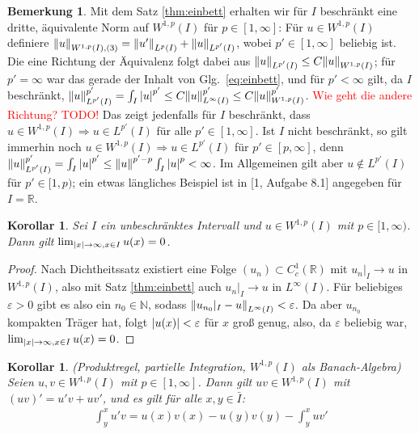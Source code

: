 \documentclass[twoside]{article}
\newtheorem{corollary}[theorem]{Korollar}
\theoremstyle{definition}
\newtheorem{remark}[theorem]{Bemerkung}
\begin{document}
\begin{remark}
Mit dem Satz \ref{thm:einbett} erhalten wir für $I$ beschränkt eine dritte, äquivalente Norm auf $W^{1,p}(I)$ für $p \in [1,\infty]$: Für $u \in W^{1,p}(I)$ definiere $\norm{u}_{W^{1,p}(I),(3)} = \norm{u'}_{L^p(I)} + \norm{u}_{L^{p'}(I)}$, wobei $p' \in [1,\infty]$ beliebig ist. Die eine Richtung der Äquivalenz folgt dabei aus $\norm{u}_{L^{p'}(I)} \leq C \norm{u}_{W^{1,p}(I)}$; für $p' = \infty$ war das gerade der Inhalt von Glg.\ \ref{eq:einbett}, und für $p' < \infty$ gilt, da $I$ beschränkt, $\norm{u}_{L^{p'}(I)}^{p'} = \int_I \abs{u}^{p'} \leq C \norm{u}_{L^\infty(I)}^{p'} \leq C \norm{u}_{W^{1,p}(I)}^{p'}$. \textcolor{red}{Wie geht die andere Richtung? TODO!} Das zeigt jedenfalls für $I$ beschränkt, dass $u \in W^{1,p}(I) \Rightarrow u \in L^{p'}(I)$ für alle $p' \in [1,\infty]$. Ist $I$  nicht beschränkt, so gilt immerhin noch $u \in W^{1,p}(I) \Rightarrow u \in L^{p'}(I)$ für $p' \in [p,\infty]$, denn $\norm{u}_{L^{p'}(I)}^{p'} = \int_I \abs{u}^{p'} \leq \norm{u}^{p'-p} \int_I \abs{u}^p < \infty$. Im Allgemeinen gilt aber $u \not \in L^{p'}(I)$ für $p' \in [1,p)$; ein etwas längliches Beispiel ist in [1, Aufgabe 8.1] angegeben für $I = \mathbb{R}$.
\end{remark}
\begin{corollary} \label{kor:gw}
Sei $I$ ein unbeschränktes Intervall und $u \in W^{1,p}(I)$ mit $p \in [1,\infty)$. Dann gilt $\lim_{\abs{x} \to \infty, x \in I} u(x) = 0$.
\end{corollary}
\begin{proof}
Nach Dichtheitssatz existiert  eine Folge $(u_n) \subset C_c^1(\mathbb{R})$ mit $u_n|_I \to u$ in $W^{1,p}(I)$, also mit Satz \ref{thm:einbett} auch $u_n|_I \to u$ in $L^{\infty}(I)$. Für beliebiges $\varepsilon > 0$ gibt es also ein $n_0 \in \mathbb{N}$, sodass $\norm{u_{n_0}|_I - u}_{L^{\infty}(I)} < \varepsilon$. Da aber $u_{n_0}$ kompakten Träger hat, folgt $\abs{u(x)} < \varepsilon$ für $x$ groß genug, also, da $\varepsilon$ beliebig war,  $\lim_{\abs{x} \to \infty, x \in I} u(x) = 0$.
\end{proof}
\begin{corollary}(Produktregel, partielle Integration, $W^{1,p}(I)$ als Banach-Algebra) \label{kor:partint}\\
Seien $u,v \in W^{1,p}(I)$ mit $p \in [1,\infty]$. Dann gilt $uv \in W^{1,p}(I)$ mit $(uv)'=u'v+uv'$, und es gilt für alle $x,y \in \bar{I}$:
\begin{align}
\int_y^x u'v = u(x)v(x)-u(y)v(y)-\int_y^xuv'
\end{align}
\end{corollary}
\end{document}
